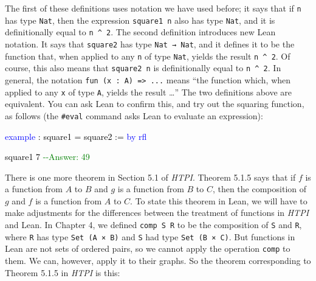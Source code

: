 \documentclass[
  letterpaper,
  DIV=11,
  numbers=noendperiod]{scrreprt}
\makeatletter
\newenvironment{Shaded}{\begin{snugshade}}{\end{snugshade}}
\newcommand{\CommentTok}[1]{\textcolor[rgb]{0.37,0.37,0.37}{#1}}
\newcommand{\DocumentationTok}[1]{\textcolor[rgb]{0.37,0.37,0.37}{\textit{#1}}}
\newcommand{\KeywordTok}[1]{\textcolor[rgb]{0.00,0.23,0.31}{#1}}
\newcommand{\NormalTok}[1]{\textcolor[rgb]{0.00,0.23,0.31}{#1}}
\newcommand{\SpecialCharTok}[1]{\textcolor[rgb]{0.37,0.37,0.37}{#1}}
\def\bluesquiggly{\bgroup \markoverwith{\textcolor[HTML]{1E90FF}{\lower3.5\p@\hbox{\sixly \char58}}}\ULon}
\renewcommand{\NormalTok}[1]{\textcolor[HTML]{000000}{#1}}
\renewcommand{\KeywordTok}[1]{\textcolor[HTML]{0000FF}{#1}}
\renewcommand{\SpecialCharTok}[1]{}
\renewcommand{\CommentTok}[1]{\textcolor[HTML]{008000}{#1}}
\renewcommand{\DocumentationTok}[1]{\bluesquiggly{\textcolor[HTML]{0000FF}{#1}}}
\theoremstyle{remark}
\makeatother
\begin{document}
The first of these definitions uses notation we have used before; it
says that if \texttt{n} has type \texttt{Nat}, then the expression
\texttt{square1\ n} also has type \texttt{Nat}, and it is definitionally
equal to \texttt{n\ \^{}\ 2}. The second definition introduces new Lean
notation. It says that \texttt{square2} has type \texttt{Nat\ →\ Nat},
and it defines it to be the function that, when applied to any
\texttt{n} of type \texttt{Nat}, yields the result \texttt{n\ \^{}\ 2}.
Of course, this also means that \texttt{square2\ n} is definitionally
equal to \texttt{n\ \^{}\ 2}. In general, the notation
\texttt{fun\ (x\ :\ A)\ =\textgreater{}\ ...} means ``the function
which, when applied to any \texttt{x} of type \texttt{A}, yields the
result \ldots{}'' The two definitions above are equivalent. You can ask
Lean to confirm this, and try out the squaring function, as follows (the
\texttt{\#eval} command asks Lean to evaluate an expression):

\begin{Shaded}
\begin{Highlighting}[]
\KeywordTok{example}\NormalTok{ : square1 = square2 := }\KeywordTok{by} \KeywordTok{rfl}

\SpecialCharTok{++}\DocumentationTok{\#eval}\SpecialCharTok{::}\NormalTok{ square1 7     }\CommentTok{{-}{-}Answer: 49}
\end{Highlighting}
\end{Shaded}

There is one more theorem in Section 5.1 of \emph{HTPI}. Theorem 5.1.5
says that if \(f\) is a function from \(A\) to \(B\) and \(g\) is a
function from \(B\) to \(C\), then the composition of \(g\) and \(f\) is
a function from \(A\) to \(C\). To state this theorem in Lean, we will
have to make adjustments for the differences between the treatment of
functions in \emph{HTPI} and Lean. In Chapter 4, we defined
\texttt{comp\ S\ R} to be the composition of \texttt{S} and \texttt{R},
where \texttt{R} has type \texttt{Set\ (A\ ×\ B)} and \texttt{S} had
type \texttt{Set\ (B\ ×\ C)}. But functions in Lean are not sets of
ordered pairs, so we cannot apply the operation \texttt{comp} to them.
We can, however, apply it to their graphs. So the theorem corresponding
to Theorem 5.1.5 in \emph{HTPI} is this:
\end{document}
